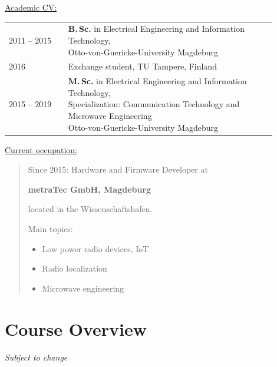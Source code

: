 \underline{Academic CV:}

\begin{tabular}{p{0.2\linewidth}p{0.7\linewidth}}
	2011 -- 2015 & \makecell[l]{\textbf{B.\,Sc.} in Electrical Engineering and Information Technology,\\ Otto-von-Guericke-University Magdeburg} \\[1.5em]
	2016 & Exchange student, TU Tampere, Finland\\[0.5em]
	2015 -- 2019 & \makecell[l]{\textbf{M.\,Sc.} in Electrical Engineering and Information Technology,\\ Specialization: Communication Technology and Microwave Engineering\\ Otto-von-Guericke-University Magdeburg} \\[0.5em]
\end{tabular}

\vspace{2em}

\underline{Current occupation:}

\begin{quote}
	Since 2015: Hardware and Firmware Developer at
	
	\textbf{metraTec GmbH, Magdeburg}
	
	located in the Wissenschaftshafen.
	
	\vspace{1em}
	
	Main topics:
	\begin{itemize}
		\item Low power radio devices, IoT
		\item Radio localization
		\item Microwave engineering
	\end{itemize}
\end{quote}


\section{Course Overview}

\textit{Subject to change}

